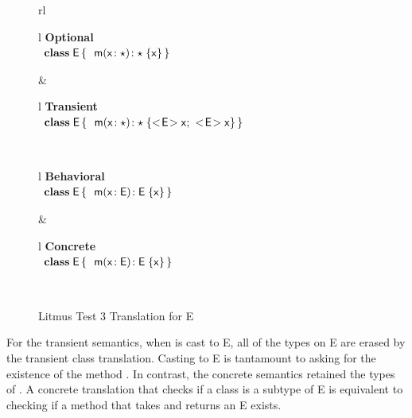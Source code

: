 \documentclass[runnningheads]{tex/llncs}
\begin{document}
\begin{figure}
  \begin{tabular}{rl}
\\
  \begin{tabular}{l}
    {\scriptsize\bf{Optional}} \\ 
\(
\begin{array}{l@{\,}l}
\Class{\xt E}{}{&\Mdef\m\x{\any}{\any}\x } \\
\end{array}
\) 
\end{tabular}&
  \begin{tabular}{l}
    {\scriptsize\bf{Transient}} \\
\(
\begin{array}{l@{\,}l}
\Class{\xt E}{}{&\Mdef\m\x\any\any{\idbody{\xt E}}} \\
\end{array}
\)
\end{tabular}\\
  \begin{tabular}{l}
    {\scriptsize\bf{Behavioral}} \\
\(
\begin{array}{l@{\,}l}
\Class{\xt E}{}{&\Mdef\m\x{\xt E}{\xt E}\x} \\
\end{array}
\) 
\end{tabular} &
  \begin{tabular}{l}
    {\scriptsize\bf{Concrete}} \\
\(
\begin{array}{l@{\,}l}
\Class{\xt E}{}{&\Mdef\m\x{\xt E}{\xt E}\x} \\
\end{array}
\) 
\end{tabular}\\
  \end{tabular}
  
  \caption{Litmus Test 3 Translation for {\xt E}}
  \label{fig:l3etrans}
\end{figure}

For the transient semantics, when \x is cast to {\xt E}, all of the types on
{\xt E} are erased by the transient class translation. Casting to
{\xt E} is tantamount to asking for the existence of the method \m. In contrast,
the concrete semantics retained the types of \m. A concrete
translation that checks if a class is a subtype of {\xt E} is equivalent to
checking if a method \m that takes and returns an {\xt E} exists.
\end{document}
